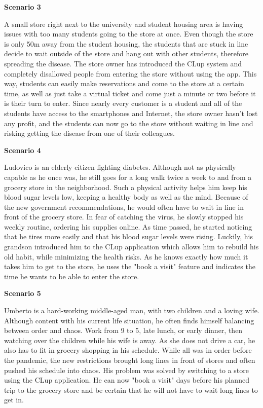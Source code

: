 \textbf{Scenario 3}

\hspace{\parindent}A small store right next to the university and student housing area is having issues with too many students going to the store at once. Even though the store is only 50m away from the student housing, the students that are stuck in line decide to wait outside of the store and hang out with other students, therefore spreading the disease. The store owner has introduced the CLup system and completely disallowed people from entering the store without using the app. This way, students can easily make reservations and come to the store at a certain time, as well as just take a virtual ticket and come just a minute or two before it is their turn to enter. Since nearly every customer is a student and all of the students have access to the smartphones and Internet, the store owner hasn't lost any profit, and the students can now go to the store without waiting in line and risking getting the disease from one of their colleagues. \break

\newpage

\textbf{Scenario 4}

\hspace{\parindent}Ludovico is an elderly citizen fighting diabetes. Although not as physically capable as he once was, he still goes for a long walk twice a week to and from a grocery store in the neighborhood. Such a physical activity helps him keep his blood sugar levels low, keeping a healthy body as well as the mind. Because of the new government recommendations, he would often have to wait in line in front of the grocery store. In fear of catching the virus, he slowly stopped his weekly routine, ordering his supplies online. As time passed, he started noticing that he tires more easily and that his blood sugar levels were rising. Luckily, his grandson introduced him to the CLup application which allows him to rebuild his old habit, while minimizing the health risks. As he knows exactly how much it takes him to get to the store, he uses the "book a visit" feature and indicates the time he wants to be able to enter the store. \break

\textbf{Scenario 5}

\hspace{\parindent}Umberto is a hard-working middle-aged man, with two children and a loving wife. Although content with his current life situation, he often finds himself balancing between order and chaos. Work from 9 to 5, late lunch, or early dinner, then watching over the children while his wife is away. As she does not drive a car, he also has to fit in grocery shopping in his schedule. While all was in order before the pandemic, the new restrictions brought long lines in front of stores and often pushed his schedule into chaos. His problem was solved by switching to a store using the CLup application. He can now "book a visit" days before his planned trip to the grocery store and be certain that he will not have to wait long lines to get in. 

